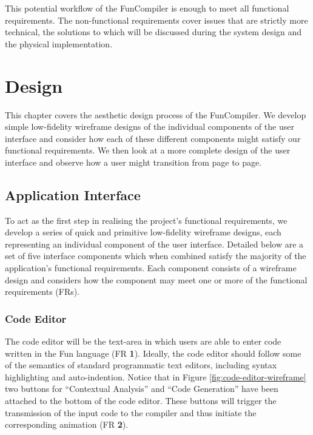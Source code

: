 \documentclass{l4proj}
\begin{document}
This potential workflow of the FunCompiler is enough to meet all functional requirements. The non-functional requirements cover issues that are strictly more technical, the solutions to which will be discussed during the system design and the physical implementation.

\chapter{Design}
This chapter covers the aesthetic design process of the FunCompiler. We develop simple low-fidelity wireframe designs of the individual components of the user interface and consider how each of these different components might satisfy our functional requirements. We then look at a more complete design of the user interface and observe how a user might transition from page to page. %

\section{Application Interface}
To act as the first step in realising the project's functional requirements, we develop a series of quick and primitive low-fidelity wireframe designs, each representing an individual component of the user interface. Detailed below are a set of five interface components which when combined satisfy the majority of the application's functional requirements. Each component consists of a wireframe design and considers how the component may meet one or more of the functional requirements (FRs).

\subsection{Code Editor}
The code editor will be the text-area in which users are able to enter code written in the Fun language (FR \textbf{1}). Ideally, the code editor should follow some of the semantics of standard programmatic text editors, including syntax highlighting and auto-indention. Notice that in Figure \ref{fig:code-editor-wireframe} two buttons for ``Contextual Analysis'' and ``Code Generation'' have been attached to the bottom of the code editor. These buttons will trigger the transmission of the input code to the compiler and thus initiate the corresponding animation (FR \textbf{2}).
\end{document}
